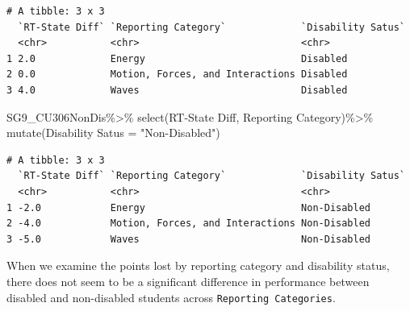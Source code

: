 \documentclass[
  letterpaper,
  DIV=11,
  numbers=noendperiod]{scrartcl}
\newenvironment{Shaded}{\begin{snugshade}}{\end{snugshade}}
\newcommand{\AttributeTok}[1]{\textcolor[rgb]{0.40,0.45,0.13}{#1}}
\newcommand{\FunctionTok}[1]{\textcolor[rgb]{0.28,0.35,0.67}{#1}}
\newcommand{\NormalTok}[1]{\textcolor[rgb]{0.00,0.23,0.31}{#1}}
\newcommand{\OtherTok}[1]{\textcolor[rgb]{0.00,0.23,0.31}{#1}}
\newcommand{\SpecialCharTok}[1]{\textcolor[rgb]{0.37,0.37,0.37}{#1}}
\newcommand{\StringTok}[1]{\textcolor[rgb]{0.13,0.47,0.30}{#1}}
\begin{document}
\begin{verbatim}
# A tibble: 3 x 3
  `RT-State Diff` `Reporting Category`             `Disability Satus`
  <chr>           <chr>                            <chr>             
1 2.0             Energy                           Disabled          
2 0.0             Motion, Forces, and Interactions Disabled          
3 4.0             Waves                            Disabled          
\end{verbatim}

\begin{Shaded}
\begin{Highlighting}[]
\NormalTok{SG9\_CU306NonDis}\SpecialCharTok{\%\textgreater{}\%}
  \FunctionTok{select}\NormalTok{(}\StringTok{\textasciigrave{}}\AttributeTok{RT{-}State Diff}\StringTok{\textasciigrave{}}\NormalTok{, }\StringTok{\textasciigrave{}}\AttributeTok{Reporting Category}\StringTok{\textasciigrave{}}\NormalTok{)}\SpecialCharTok{\%\textgreater{}\%}
  \FunctionTok{mutate}\NormalTok{(}\StringTok{\textasciigrave{}}\AttributeTok{Disability Satus}\StringTok{\textasciigrave{}} \OtherTok{=} \StringTok{"Non{-}Disabled"}\NormalTok{)}
\end{Highlighting}
\end{Shaded}

\begin{verbatim}
# A tibble: 3 x 3
  `RT-State Diff` `Reporting Category`             `Disability Satus`
  <chr>           <chr>                            <chr>             
1 -2.0            Energy                           Non-Disabled      
2 -4.0            Motion, Forces, and Interactions Non-Disabled      
3 -5.0            Waves                            Non-Disabled      
\end{verbatim}

When we examine the points lost by reporting category and disability
status, there does not seem to be a significant difference in
performance between disabled and non-disabled students across
\texttt{Reporting\ Categories}.
\end{document}
